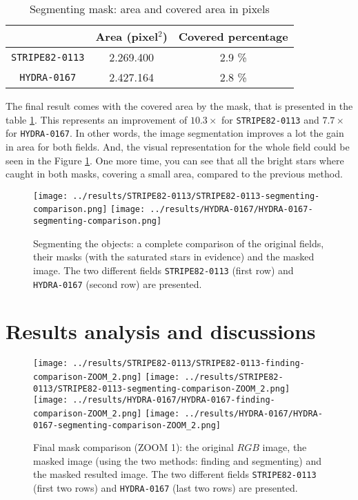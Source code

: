 \documentclass{article}
\begin{document}
\begin{table}[h!]
  \centering
  \caption{Segmenting mask: area and covered area in pixels}
  \begin{tabular}{c|c|c}
    \cline{2-3}
     & {\cellcolor{orange!20} \bf Area (pixel$^2$)} & {\cellcolor{orange!20} \bf Covered percentage} \\
    \hline
    {\cellcolor{blue!20}\texttt{STRIPE82-0113}} & 2.269.400 & 2.9 \%\\
    \hline
    {\cellcolor{blue!20}\texttt{HYDRA-0167}} & 2.427.164 & 2.8 \%\\
    \hline
  \end{tabular}
  \label{tb:segmenting_masks}
\end{table}

The final result comes with the covered area by the mask, that is presented in the table \ref{tb:segmenting_masks}. This represents an improvement of $10.3 \times$ for \texttt{STRIPE82-0113} and $7.7 \times$  for \texttt{HYDRA-0167}. In other words, the image segmentation improves a lot the gain in area for both fields. And, the visual representation for the whole field could be seen in the Figure \ref{fig:complete_mask_segmenting}. One more time, you can see that all the bright stars where caught in both masks, covering a small area, compared to the previous method.

\begin{figure}[h!]
  \centering
  \texttt{[image: ../results/STRIPE82-0113/STRIPE82-0113-segmenting-comparison.png]}
  \texttt{[image: ../results/HYDRA-0167/HYDRA-0167-segmenting-comparison.png]}
  \caption{Segmenting the objects: a complete comparison of the original fields, their masks (with the saturated stars in evidence) and the masked image. The two different fields \texttt{STRIPE82-0113} (first row) and \texttt{HYDRA-0167} (second row) are presented.}
  \label{fig:complete_mask_segmenting}
\end{figure}

\section{Results analysis and discussions}
\label{sec:res_and_disc}

\begin{figure}[h!]
  \centering
  \texttt{[image: ../results/STRIPE82-0113/STRIPE82-0113-finding-comparison-ZOOM\_2.png]}
  \texttt{[image: ../results/STRIPE82-0113/STRIPE82-0113-segmenting-comparison-ZOOM\_2.png]}
  \texttt{[image: ../results/HYDRA-0167/HYDRA-0167-finding-comparison-ZOOM\_2.png]}
  \texttt{[image: ../results/HYDRA-0167/HYDRA-0167-segmenting-comparison-ZOOM\_2.png]}
  \caption{Final mask comparison (ZOOM 1): the original $RGB$ image, the masked image (using the two methods: finding and segmenting) and the masked resulted image. The two different fields \texttt{STRIPE82-0113} (first two rows) and \texttt{HYDRA-0167} (last two rows) are presented.}
  \label{fig:final_mask_comparison-Z1}
\end{figure}
\end{document}
